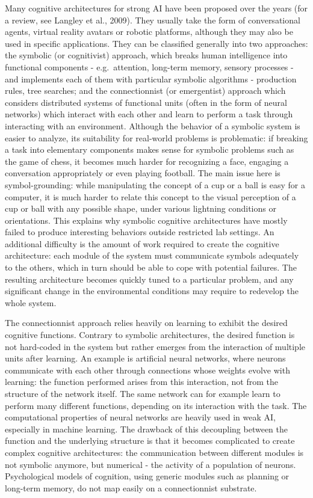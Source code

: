 \documentclass[
  11pt,
  a4paper,
]{scrbook}
\begin{document}
Many cognitive architectures for strong AI have been proposed over the
years (for a review, see Langley et al., 2009). They usually take the
form of conversational agents, virtual reality avatars or robotic
platforms, although they may also be used in specific applications. They
can be classified generally into two approaches: the symbolic (or
cognitivist) approach, which breaks human intelligence into functional
components - e.g.~attention, long-term memory, sensory processes - and
implements each of them with particular symbolic algorithms - production
rules, tree searches; and the connectionnist (or emergentist) approach
which considers distributed systems of functional units (often in the
form of neural networks) which interact with each other and learn to
perform a task through interacting with an environment. Although the
behavior of a symbolic system is easier to analyze, its suitability for
real-world problems is problematic: if breaking a task into elementary
components makes sense for symbolic problems such as the game of chess,
it becomes much harder for recognizing a face, engaging a conversation
appropriately or even playing football. The main issue here is
symbol-grounding: while manipulating the concept of a cup or a ball is
easy for a computer, it is much harder to relate this concept to the
visual perception of a cup or ball with any possible shape, under
various lightning conditions or orientations. This explains why symbolic
cognitive architectures have mostly failed to produce interesting
behaviors outside restricted lab settings. An additional difficulty is
the amount of work required to create the cognitive architecture: each
module of the system must communicate symbols adequately to the others,
which in turn should be able to cope with potential failures. The
resulting architecture becomes quickly tuned to a particular problem,
and any significant change in the environmental conditions may require
to redevelop the whole system.

The connectionnist approach relies heavily on learning to exhibit the
desired cognitive functions. Contrary to symbolic architectures, the
desired function is not hard-coded in the system but rather emerges from
the interaction of multiple units after learning. An example is
artificial neural networks, where neurons communicate with each other
through connections whose weights evolve with learning: the function
performed arises from this interaction, not from the structure of the
network itself. The same network can for example learn to perform many
different functions, depending on its interaction with the task. The
computational properties of neural networks are heavily used in weak AI,
especially in machine learning. The drawback of this decoupling between
the function and the underlying structure is that it becomes complicated
to create complex cognitive architectures: the communication between
different modules is not symbolic anymore, but numerical - the activity
of a population of neurons. Psychological models of cognition, using
generic modules such as planning or long-term memory, do not map easily
on a connectionnist substrate.
\end{document}
